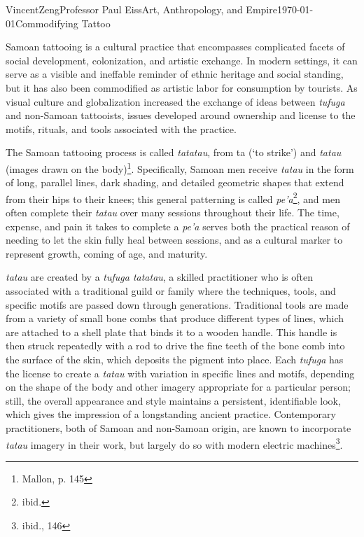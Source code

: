 \documentclass[12pt]{article}
\begin{document}
\begin{mla}{Vincent}{Zeng}{Professor Paul Eiss}{Art, Anthropology, and
  Empire}{\today}{Commodifying Tattoo}

Samoan tattooing is a cultural practice that encompasses complicated facets of
social development, colonization, and artistic exchange. In modern settings, it
can serve as a visible and ineffable reminder of ethnic heritage and social
standing, but it has also been commodified as artistic labor for consumption by
tourists. As visual culture and globalization increased the exchange of ideas
between \textit{tufuga} and non-Samoan tattooists, issues developed around
ownership and license to the motifs, rituals, and tools associated with the
practice.

The Samoan tattooing process is called \textit{tatatau}, from ta (`to strike')
and \textit{tatau} (images drawn on the body)\footnote{Mallon, p. 145}.
Specifically, Samoan men receive \textit{tatau} in the form of long, parallel
lines, dark shading, and detailed geometric shapes that extend from their hips
to their knees; this general patterning is called \textit{pe'a}\footnote{ibid.},
and men often complete their \textit{tatau} over many sessions throughout their
life. The time, expense, and pain it takes to complete a \textit{pe'a} serves
both the practical reason of needing to let the skin fully heal between
sessions, and as a cultural marker to represent growth, coming of age, and
maturity.

\textit{tatau} are created by a \textit{tufuga tatatau}, a skilled practitioner
who is often associated with a traditional guild or family where the techniques,
tools, and specific motifs are passed down through generations. Traditional
tools are made from a variety of small bone combs that produce different types
of lines, which are attached to a shell plate that binds it to a wooden handle.
This handle is then struck repeatedly with a rod to drive the fine teeth of the
bone comb into the surface of the skin, which deposits the pigment into place.
Each \textit{tufuga} has the license to create a \textit{tatau} with variation
in specific lines and motifs, depending on the shape of the body and other
imagery appropriate for a particular person; still, the overall appearance and
style maintains a persistent, identifiable look, which gives the impression of a
longstanding ancient practice. Contemporary practitioners, both of Samoan and
non-Samoan origin, are known to incorporate \textit{tatau} imagery in their
work, but largely do so with modern electric machines\footnote{ibid., 146}.


\end{mla}
\end{document}
